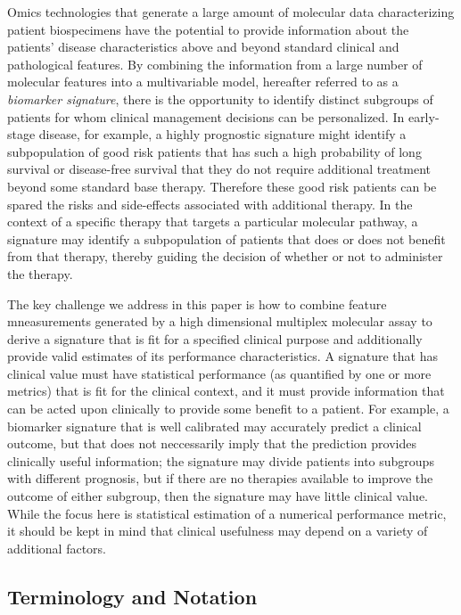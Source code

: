 \documentclass[11pt,]{article}
\begin{document}
Omics technologies that generate a large amount of molecular data
characterizing patient biospecimens have the potential to provide
information about the patients' disease characteristics above and beyond
standard clinical and pathological features. By combining the
information from a large number of molecular features into a
multivariable model, hereafter referred to as a \emph{biomarker
signature}, there is the opportunity to identify distinct subgroups of
patients for whom clinical management decisions can be personalized. In
early-stage disease, for example, a highly prognostic signature might
identify a subpopulation of good risk patients that has such a high
probability of long survival or disease-free survival that they do not
require additional treatment beyond some standard base therapy.
Therefore these good risk patients can be spared the risks and
side-effects associated with additional therapy. In the context of a
specific therapy that targets a particular molecular pathway, a
signature may identify a subpopulation of patients that does or does not
benefit from that therapy, thereby guiding the decision of whether or
not to administer the therapy.

The key challenge we address in this paper is how to combine feature
mneasurements generated by a high dimensional multiplex molecular assay
to derive a signature that is fit for a specified clinical purpose and
additionally provide valid estimates of its performance characteristics.
A signature that has clinical value must have statistical performance
(as quantified by one or more metrics) that is fit for the clinical
context, and it must provide information that can be acted upon
clinically to provide some benefit to a patient. For example, a
biomarker signature that is well calibrated may accurately predict a
clinical outcome, but that does not neccessarily imply that the
prediction provides clinically useful information; the signature may
divide patients into subgroups with different prognosis, but if there
are no therapies available to improve the outcome of either subgroup,
then the signature may have little clinical value. While the focus here
is statistical estimation of a numerical performance metric, it should
be kept in mind that clinical usefulness may depend on a variety of
additional factors.

\subsection{Terminology and Notation}\label{terminology-and-notation}
\end{document}
